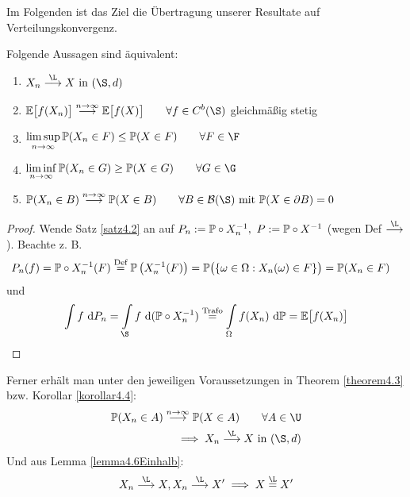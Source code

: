 Im Folgenden ist das Ziel die Übertragung unserer Resultate auf Verteilungskonvergenz.

\begin{satz}\label{satz4.7}\enter
Folgende Aussagen sind äquivalent:
\begin{enumerate}[label=(\arabic*)]
\item $\begin{aligned}
X_n\stackrel{\L}{\longrightarrow} X\text{ in }(\S,d)
\end{aligned}$
\item $\begin{aligned}
\E\big[f(X_n)\big]\stackrel{n\to\infty}{\longrightarrow}\E\big[f(X)\big]\qquad\forall f\in C^b(\S)
\end{aligned}$ gleichmäßig stetig
\item $\begin{aligned}
\limsup\limits_{n\to\infty}\P(X_n\in F)\leq\P(X\in F)\qquad\forall F\in\F
\end{aligned}$
\item $\begin{aligned}
\liminf\limits_{n\to\infty}\P(X_n\in G)\geq\P(X\in G)\qquad\forall G\in\G
\end{aligned}$
\item $\begin{aligned}
\P(X_n\in B)\stackrel{n\to\infty}{\longrightarrow}\P(X\in B)\qquad\forall B\in\B(\S)\mit\P(X\in\partial B)=0
\end{aligned}$
\end{enumerate}
\end{satz}
\begin{proof}
Wende Satz \ref{satz4.2} an auf $P_n:=\P\circ X^{-1}_n,~P:=\P\circ X^{-1}$ (wegen Def $\stackrel{\L}{\longrightarrow}$). Beachte z. B.
\begin{align*}
P_n(f)&=\P\circ X^{-1}_n(F)
\stackeq{\text{Def}}
\P\left(X_n^{-1}(F)\right)
=\P\big(\lbrace\omega\in\Omega:X_n(\omega)\in F\rbrace\big)
=\P(X_n\in F)
\end{align*}
und 
\begin{align*}
\int\limits f\d P_n
=
\int\limits_{\S} f\d(\P\circ X_n^{-1})
\stackeq{\text{Trafo}}
\int\limits_\Omega f(X_n)\d\P
=\E\big[f(X_n)\big]
\end{align*}
\end{proof}

Ferner erhält man unter den jeweiligen Voraussetzungen in Theorem \ref{theorem4.3} bzw. Korollar \ref{korollar4.4}:
\begin{align*}
\P(X_n\in A)\stackrel{n\to\infty}{\longrightarrow}\P(X\in A)\qquad\forall A\in\U\\
\implies X_n\stackrel{\L}{\longrightarrow} X\text{ in }(\S,d)
\end{align*}
Und aus Lemma \ref{lemma4.6Einhalb}:
\begin{align*}
X_n\stackrel{\L}{\longrightarrow} X,X_n\stackrel{\L}{\longrightarrow} X'\implies X\stackeq{\L}X'
\end{align*}


